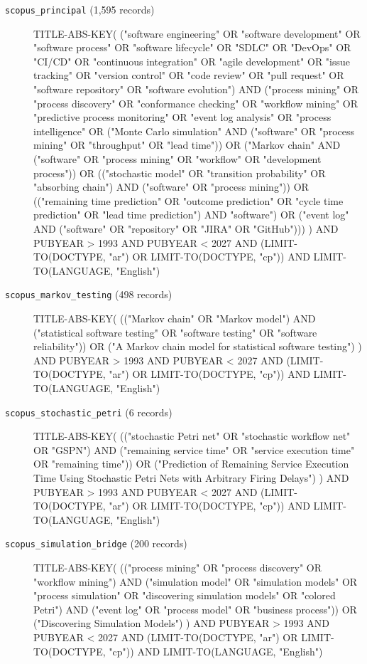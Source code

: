 \begin{description}
\item[\texttt{scopus\_principal} (1{,}595 records)]{\footnotesize\ttfamily\raggedright
TITLE-ABS-KEY( ("software engineering" OR "software development" OR "software process" OR "software lifecycle" OR "SDLC" OR "DevOps" OR "CI/CD" OR "continuous integration" OR "agile development" OR "issue tracking" OR "version control" OR "code review" OR "pull request" OR "software repository" OR "software evolution") AND ("process mining" OR "process discovery" OR "conformance checking" OR "workflow mining" OR "predictive process monitoring" OR "event log analysis" OR "process intelligence" OR ("Monte Carlo simulation" AND ("software" OR "process mining" OR "throughput" OR "lead time")) OR ("Markov chain" AND ("software" OR "process mining" OR "workflow" OR "development process")) OR (("stochastic model" OR "transition probability" OR "absorbing chain") AND ("software" OR "process mining")) OR (("remaining time prediction" OR "outcome prediction" OR "cycle time prediction" OR "lead time prediction") AND "software") OR ("event log" AND ("software" OR "repository" OR "JIRA" OR "GitHub"))) ) AND PUBYEAR > 1993 AND PUBYEAR < 2027 AND (LIMIT-TO(DOCTYPE, "ar") OR LIMIT-TO(DOCTYPE, "cp")) AND LIMIT-TO(LANGUAGE, "English")\par}

\item[\texttt{scopus\_markov\_testing} (498 records)]{\footnotesize\ttfamily\raggedright
TITLE-ABS-KEY( (("Markov chain" OR "Markov model") AND ("statistical software testing" OR "software testing" OR "software reliability")) OR ("A Markov chain model for statistical software testing") ) AND PUBYEAR > 1993 AND PUBYEAR < 2027 AND (LIMIT-TO(DOCTYPE, "ar") OR LIMIT-TO(DOCTYPE, "cp")) AND LIMIT-TO(LANGUAGE, "English")\par}

\item[\texttt{scopus\_stochastic\_petri} (6 records)]{\footnotesize\ttfamily\raggedright
TITLE-ABS-KEY( (("stochastic Petri net" OR "stochastic workflow net" OR "GSPN") AND ("remaining service time" OR "service execution time" OR "remaining time")) OR ("Prediction of Remaining Service Execution Time Using Stochastic Petri Nets with Arbitrary Firing Delays") ) AND PUBYEAR > 1993 AND PUBYEAR < 2027 AND (LIMIT-TO(DOCTYPE, "ar") OR LIMIT-TO(DOCTYPE, "cp")) AND LIMIT-TO(LANGUAGE, "English")\par}

\item[\texttt{scopus\_simulation\_bridge} (200 records)]{\footnotesize\ttfamily\raggedright
TITLE-ABS-KEY( (("process mining" OR "process discovery" OR "workflow mining") AND ("simulation model" OR "simulation models" OR "process simulation" OR "discovering simulation models" OR "colored Petri") AND ("event log" OR "process model" OR "business process")) OR ("Discovering Simulation Models") ) AND PUBYEAR > 1993 AND PUBYEAR < 2027 AND (LIMIT-TO(DOCTYPE, "ar") OR LIMIT-TO(DOCTYPE, "cp")) AND LIMIT-TO(LANGUAGE, "English")\par}


\end{description}
